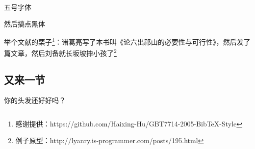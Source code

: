 {\wuhao 五号字体}

{ 然后搞点黑体}

举个文献的栗子\footnote{感谢提供：https://github.com/Haixing-Hu/GBT7714-2005-BibTeX-Style}：诸葛亮写了本书叫《论六出祁山的必要性与可行性》\textsuperscript{\cite{诸葛亮:Book}}，然后发了篇文章\cite{诸葛亮:Article}，然后刘备就长坂坡摔小孩了\textsuperscript{\cite{刘备:摔小孩}}\footnote{例子原型：http://lyanry.is-programmer.com/posts/195.html}

\subsection{又来一节}
你的头发还好好吗？
